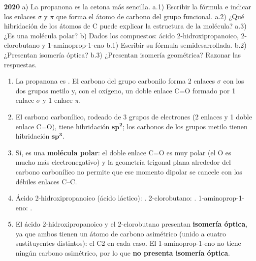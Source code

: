 \begin{exerciseEVAU}
    \textbf{2020} a) La propanona es la cetona más sencilla. a.1) Escribir la fórmula e indicar los enlaces \(\sigma\) y \(\pi\) que forma el átomo de carbono del grupo funcional. a.2) ¿Qué hibridación de los átomos de C puede explicar la estructura de la molécula? a.3) ¿Es una molécula polar? b) Dados los compuestos: ácido 2-hidroxipropanoico, 2-clorobutano y 1-aminoprop-1-eno b.1) Escribir su fórmula semidesarrollada. b.2) ¿Presentan isomería óptica? b.3) ¿Presentan isomería geométrica? Razonar las respuestas.

    \begin{solu}


        \begin{enumerate}[label=\letraminuscula]
            \item[a.1)] La propanona es . El carbono del grupo carbonilo forma 2 enlaces \(\sigma\) con los dos grupos metilo y, con el oxígeno, un doble enlace C=O formado por 1 enlace \(\sigma\) y 1 enlace \(\pi\).

            \item[a.2)] El carbono carbonílico, rodeado de 3 grupos de electrones (2 enlaces  y 1 doble enlace C=O), tiene hibridación \(\bm{sp^2}\); los carbonos de los grupos metilo tienen hibridación \(\bm{sp^3}\).

            \item[a.3)] Sí, es una \textbf{molécula polar}: el doble enlace C=O es muy polar (el O es mucho más electronegativo) y la geometría trigonal plana alrededor del carbono carbonílico no permite que ese momento dipolar se cancele con los débiles enlaces C--C.

            \item[b.1)] Ácido 2-hidroxipropanoico (ácido láctico): . 2-clorobutano: . 1-aminoprop-1-eno: .

            \item[b.2)] El ácido 2-hidroxipropanoico y el 2-clorobutano presentan \textbf{isomería óptica}, ya que ambos tienen un átomo de carbono asimétrico (unido a cuatro sustituyentes distintos): el C2 en cada caso. El 1-aminoprop-1-eno no tiene ningún carbono asimétrico, por lo que \textbf{no presenta isomería óptica}.


\end{enumerate}
\end{solu}
\end{exerciseEVAU}
